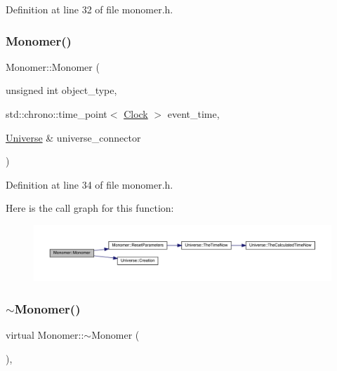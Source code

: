 Definition at line 32 of file monomer.\+h.

\mbox{\label{class_monomer_ae2b80466a0e724125aee173df34d1a6c}} 
\subsubsection{\texorpdfstring{Monomer()}{Monomer()}\hspace{0.1cm}{\footnotesize\ttfamily [4/4]}}
{\footnotesize\ttfamily Monomer\+::\+Monomer (\begin{DoxyParamCaption}\item[{unsigned int}]{object\+\_\+type,  }\item[{std\+::chrono\+::time\+\_\+point$<$ \hyperlink{universe_8h_a0ef8d951d1ca5ab3cfaf7ab4c7a6fd80}{Clock} $>$}]{event\+\_\+time,  }\item[{\hyperlink{class_universe}{Universe} \&}]{universe\+\_\+connector }\end{DoxyParamCaption})\hspace{0.3cm}{\ttfamily [inline]}}



Definition at line 34 of file monomer.\+h.

Here is the call graph for this function\+:
\nopagebreak
\begin{figure}[H]
\begin{center}
\leavevmode
\includegraphics[width=350pt]{class_monomer_ae2b80466a0e724125aee173df34d1a6c_cgraph}
\end{center}
\end{figure}
\mbox{\label{class_monomer_a802bf239fc55d16783736393edbd6899}} 
\subsubsection{\texorpdfstring{$\sim$\+Monomer()}{~Monomer()}}
{\footnotesize\ttfamily virtual Monomer\+::$\sim$\+Monomer (\begin{DoxyParamCaption}{ }\end{DoxyParamCaption})\hspace{0.3cm}{\ttfamily [inline]}, {\ttfamily [virtual]}}

